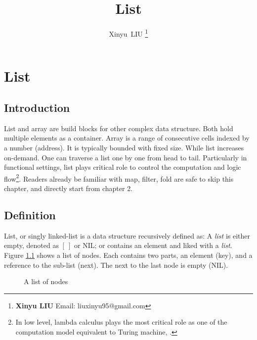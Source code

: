 \documentclass[b5paper]{article}
\begin{document}
\title{List}

\author{Xinyu~LIU
\thanks{{\bfseries Xinyu LIU} \newline
  Email: liuxinyu95@gmail.com \newline}
  }

\maketitle
\fi


\ifx\wholebook\relax
\chapter{List}
\fi

\section{Introduction}
\label{introduction}

List and array are build blocks for other complex data structure. Both hold multiple elements as a container. Array is a range of consecutive cells indexed by a number (address). It is typically bounded with fixed size. While list increases on-demand. One can traverse a list one by one from head to tail. Particularly in functional settings, list plays critical role to control the computation and logic flow\footnote{In low level, lambda calculus plays the most critical role as one of the computation model equivalent to Turing machine\cite{mittype}, \cite{unplugged}.}. Readers already be familiar with map, filter, fold are safe to skip this chapter, and directly start from chapter 2.

\section{Definition}

List, or singly linked-list is a data structure recursively defined as: A {\em list} is either empty, denoted as $[\ ]$ or NIL; or contains an element and liked with a {\em list}. Figure \ref{fig:list-example} shows a list of nodes. Each contains two parts, an element (key), and a reference to the sub-list (next). The next to the last node is empty (NIL).

\begin{figure}[htbp]
  \centering
  \caption{A list of nodes}
  \label{fig:list-example}
\end{figure}
\end{document}

